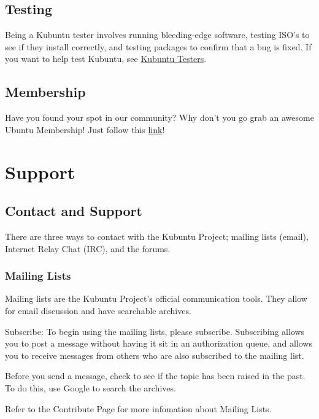 \documentclass[letterpaper,10pt,english]{sphinxmanual}
\begin{document}
\section{Testing}
\label{docs/contribute:testing}
Being a Kubuntu tester involves running bleeding-edge software, testing ISO's to see if they install correctly, and testing packages to confirm that a bug is fixed. If you want to help test Kubuntu, see \href{https://wiki.kubuntu.org/KubuntuTesters}{Kubuntu Testers}.


\section{Membership}
\label{docs/contribute:membership}
Have you found your spot in our community? Why don't you go grab an awesome Ubuntu Membership! Just follow this \href{https://wiki.ubuntu.com/Membership}{link}!


\chapter{Support}
\label{docs/support:support}\label{docs/support::doc}\label{docs/support:support-link}

\section{Contact and Support}
\label{docs/support:contact-and-support}
There are three ways to contact with the Kubuntu Project; mailing lists (email), Internet Relay Chat (IRC), and the forums.


\subsection{Mailing Lists}
\label{docs/support:mailing-lists}
Mailing lists are the Kubuntu Project's official communication tools. They allow for email discussion and have searchable archives.

Subscribe:
To begin using the mailing lists, please subscribe. Subscribing allows you to post a message without having it sit in an authorization queue, and allows you to receive messages from others who are also subscribed to the mailing list.

Before you send a message, check to see if the topic has been raised in the past. To do this, use Google to search the archives.

Refer to the Contribute Page for more infomation about Mailing Lists.
\end{document}
